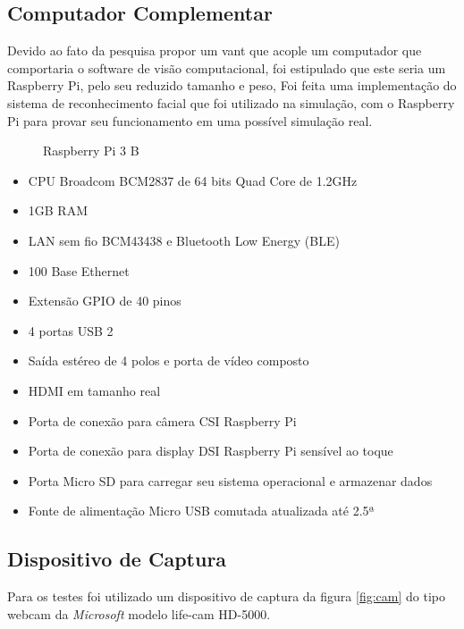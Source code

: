 \subsection{Computador Complementar}
\label{subsec:compcomp}

Devido ao fato da pesquisa propor um vant que acople um computador que comportaria o software de visão computacional, foi estipulado que este seria um Raspberry Pi, pelo seu reduzido tamanho e peso, Foi feita uma implementação do sistema de reconhecimento facial que foi utilizado na simulação, com o Raspberry Pi para provar seu funcionamento em uma possível simulação real. 

\begin{figure}[H]
	\centering	
	\caption{Raspberry Pi 3 B}
	\def\svgwidth{15cm}
	
	\label{fig:gpiorasp}
\end{figure}

\begin{itemize}
	\item CPU Broadcom BCM2837 de 64 bits Quad Core de 1.2GHz
	\item 1GB RAM
	\item LAN sem fio BCM43438 e Bluetooth Low Energy (BLE)
	\item 100 Base Ethernet
	\item Extensão GPIO de 40 pinos
	\item 4 portas USB 2
	\item Saída estéreo de 4 polos e porta de vídeo composto
	\item HDMI em tamanho real
	\item Porta de conexão para câmera CSI Raspberry Pi
	\item Porta de conexão para display DSI Raspberry Pi sensível ao toque
	\item Porta Micro SD para carregar seu sistema operacional e armazenar dados
	\item Fonte de alimentação Micro USB comutada atualizada até 2.5ª
\end{itemize}

\subsection{Dispositivo de Captura}

Para os testes foi utilizado um dispositivo de captura da figura \ref{fig:cam} do tipo webcam da \textit{Microsoft} modelo life-cam HD-5000.

